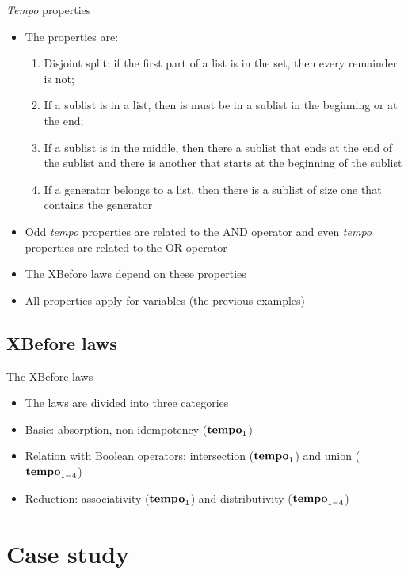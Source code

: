 \documentclass{beamer}
\def\tempoop{\ensuremath\operatorname{\mathbf{tempo}}}
\newcommand{\tempo}[2][1-4]{\ensuremath\tempoop_{#1} #2}
\begin{document}
\begin{frame}[label=tempo]{\emph{Tempo} properties}
	\begin{itemize}
		\item The properties are:
		\begin{enumerate}
			\item Disjoint split: if the first part of a list is in the set, then every remainder is not;
			\item If a sublist is in a list, then is must be in a sublist in the beginning or at the end;
			\item If a sublist is in the middle, then there a sublist that ends at the end of the sublist and there is another that starts at the beginning of the sublist
			\item If a generator belongs to a list, then there is a sublist of size one that contains the generator
		\end{enumerate}
		\item Odd \emph{tempo} properties are related to the AND operator and even \emph{tempo} properties are related to the OR operator
		\item The XBefore laws depend on these properties
		\item All properties apply for variables (the previous examples)
	\end{itemize}
	\hyperlink{tempodetail}{}
\end{frame}

\subsection{XBefore laws}

\begin{frame}{The XBefore laws}
	\begin{itemize}
		\item The laws are divided into three categories
		\item Basic: absorption, non-idempotency ($\tempo[1]$)
		\item Relation with Boolean operators: intersection ($\tempo[1]$) and union ($\tempo$)
		\item Reduction: associativity ($\tempo[1]$) and distributivity ($\tempo$)
	\end{itemize}
\end{frame}

\section{Case study}
\end{document}
